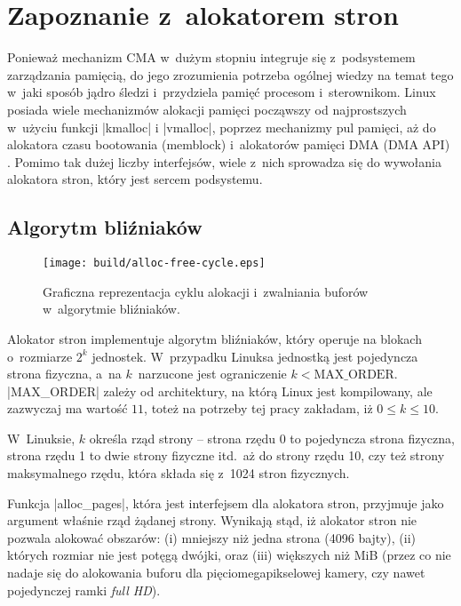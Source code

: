 \section{Zapoznanie z~alokatorem stron}

Ponieważ mechanizm CMA w~dużym stopniu integruje się z~podsystemem
zarządzania pamięcią, do jego zrozumienia potrzeba ogólnej wiedzy na
temat tego w~jaki sposób jądro śledzi i~przydziela pamięć procesom
i~sterownikom.  Linux posiada wiele mechanizmów alokacji pamięci
począwszy od najprostszych w~użyciu funkcji \code|kmalloc|
i \code|vmalloc|, poprzez mechanizmy pul pamięci, aż do alokatora
czasu bootowania (memblock) i~alokatorów pamięci DMA (DMA API)
\autocite[rozdział 8]{bib:ldd3}.  Pomimo tak dużej liczby interfejsów,
wiele z~nich sprowadza się do wywołania alokatora stron, który jest
sercem podsystemu.

\subsection{Algorytm bliźniaków}

\begin{wrapfigure}{o}[1.5cm]{0.3\textwidth}
\begin{center}
\texttt{[image: build/alloc-free-cycle.eps]}
\end{center}
\caption[Zarządzanie pamięcią w~algorytmie bliźniaków]{Graficzna
  reprezentacja cyklu alokacji i~zwalniania buforów w~algorytmie
  bliźniaków.}
\end{wrapfigure}

Alokator stron implementuje algorytm bliźniaków, który operuje na
blokach o~rozmiarze $2^k$ jednostek.  W~przypadku Linuksa jednostką
jest pojedyncza strona fizyczna, a~na $k$~narzucone jest ograniczenie
$k < \mathrm{MAX\_ORDER}$.  \code|MAX_ORDER| zależy od architektury,
na którą Linux jest kompilowany, ale zazwyczaj ma wartość $11$, toteż
na potrzeby tej pracy zakładam, iż $0 \le k \le 10$.

W~Linuksie, $k$ określa rząd strony -- strona rzędu 0 to pojedyncza
strona fizyczna, strona rzędu 1 to dwie strony fizyczne itd.\ aż do
strony rzędu 10, czy też strony maksymalnego rzędu, która składa się
z~1024 stron fizycznych.

Funkcja \code|alloc_pages|, która jest interfejsem dla alokatora
stron, przyjmuje jako argument właśnie rząd żądanej strony.  Wynikają
stąd, iż alokator stron nie pozwala alokować obszarów: (i) mniejszy
niż jedna strona (4096 bajty), (ii) których rozmiar nie jest potęgą
dwójki, oraz (iii) większych niż \unit[4]{MiB} (przez co nie nadaje
się do alokowania buforu dla pięciomegapikselowej kamery, czy nawet
pojedynczej ramki {\it full HD}).


